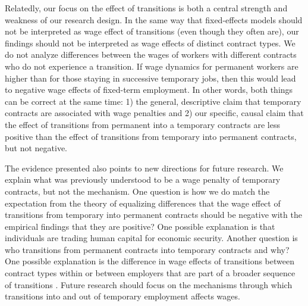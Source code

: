 \documentclass[12pt]{article}
\begin{document}
Relatedly, our focus on the effect of transitions is both a central strength and weakness of our research design.  In the same way that fixed-effects models should not be interpreted as wage effect of transitions (even though they often are), our findings should not be interpreted as wage effects of distinct contract types.  We do not analyze differences between the wages of workers with different contracts who do not experience a transition.  If wage dynamics for permanent workers are higher than for those staying in successive temporary jobs, then this would lead to negative wage effects of fixed-term employment.  In other words, both things can be correct at the same time: 1) the general, descriptive claim that temporary contracts are associated with wage penalties and 2) our specific, causal claim that the effect of transitions from permanent into a temporary contracts are less positive than the effect of transitions from temporary into permanent contracts, but not negative.

The evidence presented also points to new directions for future research.  We explain what was previously understood to be a wage penalty of temporary contracts, but not the mechanism.  One question is how we do match the expectation from the theory of equalizing differences that the wage effect of transitions from temporary into permanent contracts should be negative with the empirical findings that they are positive?  One possible explanation is that individuals are trading human capital for economic security.  Another question is who transitions from permanent contracts into temporary contracts and why?  One possible explanation is the difference in wage effects of transitions between contract types within or between employers that are part of a broader sequence of transitions \citep{fauser2024wage}.  Future research should focus on the mechanisms through which transitions into and out of temporary employment affects wages.





\clearpage
\singlespacing





\end{document}
